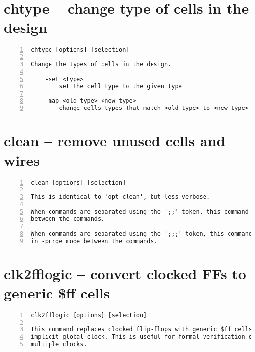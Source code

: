 \section{chtype -- change type of cells in the design}
\label{cmd:chtype}
\begin{lstlisting}[numbers=left,frame=single]
    chtype [options] [selection]

Change the types of cells in the design.

    -set <type>
        set the cell type to the given type

    -map <old_type> <new_type>
        change cells types that match <old_type> to <new_type>
\end{lstlisting}

\section{clean -- remove unused cells and wires}
\label{cmd:clean}
\begin{lstlisting}[numbers=left,frame=single]
    clean [options] [selection]

This is identical to 'opt_clean', but less verbose.

When commands are separated using the ';;' token, this command will be executed
between the commands.

When commands are separated using the ';;;' token, this command will be executed
in -purge mode between the commands.
\end{lstlisting}

\section{clk2fflogic -- convert clocked FFs to generic \$ff cells}
\label{cmd:clk2fflogic}
\begin{lstlisting}[numbers=left,frame=single]
    clk2fflogic [options] [selection]

This command replaces clocked flip-flops with generic $ff cells that use the
implicit global clock. This is useful for formal verification of designs with
multiple clocks.
\end{lstlisting}

